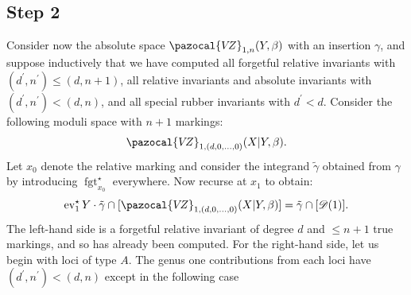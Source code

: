 \documentclass[11pt]{amsart}
\newcommand{\sqC}{\scalebox{0.8}[1.3]{$\sqsubset$}}
\newcommand{\VZ}{\pazocal{V\!Z}}
\newcommand{\st}{\star}
\newcommand{\ev}{\operatorname{ev}}
\newcommand{\fgt}{\operatorname{fgt}}
\newcommand{\Dcal}{\mathcal{D}}
\theoremstyle{definition}
\theoremstyle{definition}
\begin{document}
\subsection*{Step 2} Consider now the absolute space $\VZ_{1,n}(Y,\beta)$ with an insertion $\gamma$, and suppose inductively that we have computed all forgetful relative invariants with $(d^\prime,n^\prime) \leq (d,n+1)$, all relative invariants and absolute invariants with $(d^\prime,n^\prime) < (d,n)$, and all special rubber invariants with $d^\prime < d$. Consider the following moduli space with $n+1$ markings:
\begin{equation*} \VZ_{1,(d,0,\ldots,0)}(X|Y,\beta). \end{equation*}
Let $x_0$ denote the relative marking and consider the integrand $\tilde\gamma$ obtained from $\gamma$ by introducing $\fgt^\st_{x_0}$ everywhere. Now recurse at $x_1$ to obtain:
\begin{equation}\label{step 2 recursion} \ev_1^\st Y \cdot \tilde\gamma \cap [\VZ_{1,(d,0,\ldots,0)}(X|Y,\beta)] = \tilde\gamma\cap[\Dcal(1)].\end{equation}
The left-hand side is a forgetful relative invariant of degree $d$ and $\leq n+1$ true markings, and so has already been computed. For the right-hand side, let us begin with loci of type $A$. The genus one contributions from each loci have $(d^\prime,n^\prime) < (d,n)$ except in the following case
\begin{center}
\end{center}
\end{document}
